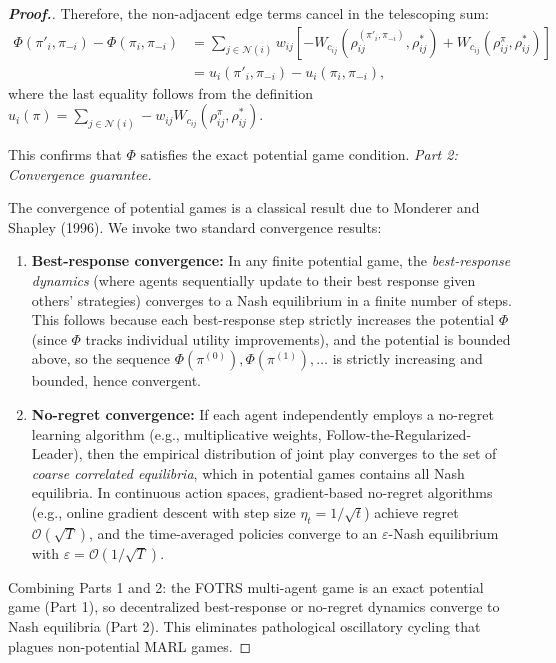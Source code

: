 \documentclass[12pt,a4paper,oneside]{report}
\theoremstyle{definition}
\theoremstyle{remark}
\begin{document}
\begin{proof}[\textbf{Proof.}]
Therefore, the non-adjacent edge terms cancel in the telescoping sum:
\begin{align*}
\Phi(\pi'_i, \pi_{-i}) - \Phi(\pi_i, \pi_{-i}) &= \sum_{j \in \mathcal{N}(i)} w_{ij} \left[- W_{c_{ij}}(\rho^{(\pi'_i, \pi_{-i})}_{ij}, \rho^*_{ij}) + W_{c_{ij}}(\rho^\pi_{ij}, \rho^*_{ij})\right] \\
&= u_i(\pi'_i, \pi_{-i}) - u_i(\pi_i, \pi_{-i}),
\end{align*}
where the last equality follows from the definition $u_i(\pi) = \sum_{j \in \mathcal{N}(i)} -w_{ij} W_{c_{ij}}(\rho^\pi_{ij}, \rho^*_{ij})$.

This confirms that $\Phi$ satisfies the exact potential game condition.
\medskip
\noindent\textit{Part 2: Convergence guarantee.}

The convergence of potential games is a classical result due to Monderer and Shapley (1996). We invoke two standard convergence results:

\begin{enumerate}[leftmargin=2em]
  \item \textbf{Best-response convergence:} In any finite potential game, the \emph{best-response dynamics} (where agents sequentially update to their best response given others' strategies) converges to a Nash equilibrium in a finite number of steps. This follows because each best-response step strictly increases the potential $\Phi$ (since $\Phi$ tracks individual utility improvements), and the potential is bounded above, so the sequence $\Phi(\pi^{(0)}), \Phi(\pi^{(1)}), \ldots$ is strictly increasing and bounded, hence convergent.
  \item \textbf{No-regret convergence:} If each agent independently employs a no-regret learning algorithm (e.g., multiplicative weights, Follow-the-Regularized-Leader), then the empirical distribution of joint play converges to the set of \emph{coarse correlated equilibria}, which in potential games contains all Nash equilibria. In continuous action spaces, gradient-based no-regret algorithms (e.g., online gradient descent with step size $\eta_t = 1/\sqrt{t}$) achieve regret $\mathcal{O}(\sqrt{T})$, and the time-averaged policies converge to an $\varepsilon$-Nash equilibrium with $\varepsilon = \mathcal{O}(1/\sqrt{T})$.
\end{enumerate}

Combining Parts 1 and 2: the FOTRS multi-agent game is an exact potential game (Part 1), so decentralized best-response or no-regret dynamics converge to Nash equilibria (Part 2). This eliminates pathological oscillatory cycling that plagues non-potential MARL games.
\end{proof}
\end{document}
